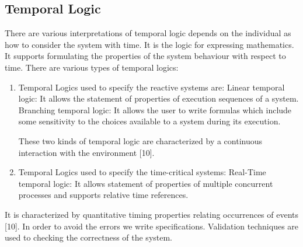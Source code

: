 \documentclass{article}
\begin{document}
\subsection{Temporal Logic}
There are various interpretations of temporal logic depends on the individual as how to consider the system with time. It is the logic for expressing mathematics. It supports formulating the properties of the system behaviour with respect to time. \newline There are various types of temporal logics: \newline



\begin{enumerate}
\item Temporal Logics used to specify the reactive systems are: \newline
 Linear temporal logic:  It allows the statement of properties of execution sequences of a system. \newline
 Branching temporal logic: It allows the user to write formulas which include some sensitivity to the choices available to a system during its execution.\newline
 
These two kinds of temporal logic are characterized by a continuous interaction with the environment [10].\newline
\item	Temporal Logics used to specify the time-critical systems: \newline
Real-Time temporal logic: It allows statement of properties of multiple concurrent processes and supports relative time references.\newline
\end{enumerate}

It is characterized by quantitative timing properties relating occurrences of events [10].
In order to avoid the errors we write specifications. Validation techniques are used to checking the correctness of the system. 
\end{document}
